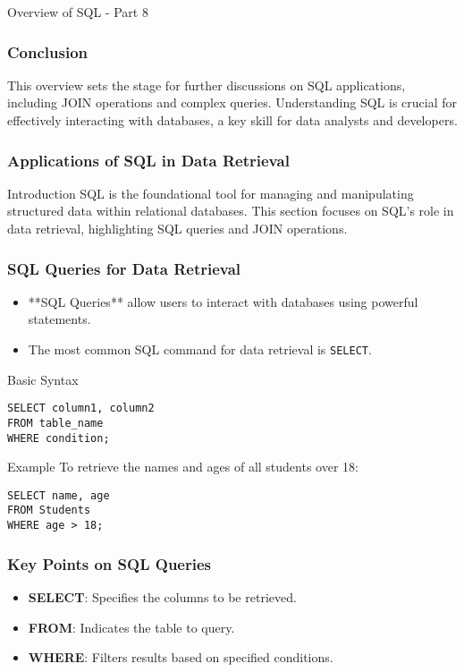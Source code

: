 \documentclass[aspectratio=169]{beamer}
\begin{document}
\begin{frame}{Overview of SQL - Part 8}
    \frametitle{Conclusion}
    This overview sets the stage for further discussions on SQL applications, including JOIN operations and complex queries. 
    Understanding SQL is crucial for effectively interacting with databases, a key skill for data analysts and developers.
\end{frame}

\begin{frame}[fragile]
    \frametitle{Applications of SQL in Data Retrieval}
    \begin{block}{Introduction}
        SQL is the foundational tool for managing and manipulating structured data within relational databases.
        This section focuses on SQL's role in data retrieval, highlighting SQL queries and JOIN operations.
    \end{block}
\end{frame}

\begin{frame}[fragile]
    \frametitle{SQL Queries for Data Retrieval}
    \begin{itemize}
        \item **SQL Queries** allow users to interact with databases using powerful statements.
        \item The most common SQL command for data retrieval is \texttt{SELECT}.
    \end{itemize}
    
    \begin{block}{Basic Syntax}
        \begin{verbatim}
SELECT column1, column2
FROM table_name
WHERE condition;
        \end{verbatim}
    \end{block}

    \begin{block}{Example}
        To retrieve the names and ages of all students over 18:
        \begin{verbatim}
SELECT name, age
FROM Students
WHERE age > 18;
        \end{verbatim}
    \end{block}
\end{frame}

\begin{frame}[fragile]
    \frametitle{Key Points on SQL Queries}
    \begin{itemize}
        \item \textbf{SELECT}: Specifies the columns to be retrieved.
        \item \textbf{FROM}: Indicates the table to query.
        \item \textbf{WHERE}: Filters results based on specified conditions.
    \end{itemize}
\end{frame}
\end{document}
